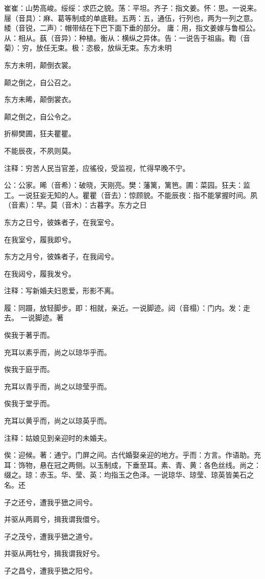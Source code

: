 \documentclass[12pt,UTF8]{ctexbook}
\begin{document}
崔崔：山势高峻。绥绥：求匹之貌。荡：平坦。齐子：指文姜。怀：思。一说来。屦（音具）：麻、葛等制成的单底鞋。五两：五，通伍，行列也，两为一列之意。緌（音锐，二声）：帽带结在下巴下面下垂的部分。 庸：用，指文姜嫁与鲁桓公。从：相从。蓺（音异）：种植。衡从：横纵之异体。告：一说告于祖庙。鞫（音菊）：穷，放任无束。极：恣极，放纵无束。东方未明

东方未明，颠倒衣裳。

颠之倒之，自公召之。

东方未晞，颠倒裳衣。

颠之倒之，自公令之。

折柳樊圃，狂夫瞿瞿。

不能辰夜，不夙则莫。

注释：穷苦人民当官差，应徭役，受监视，忙得早晚不宁。

公：公家。晞（音希）：破晓，天刚亮。樊：藩篱，篱笆。圃：菜园。狂夫：监工。一说狂妄无知的人。瞿瞿（音去）：惊顾貌。不能辰夜：指不能掌握时间。夙（音素）：早。莫（音木）：古暮字。东方之日

东方之日兮，彼姝者子，在我室兮。

在我室兮，履我即兮。

东方之月兮，彼姝者子，在我闼兮。

在我闼兮，履我发兮。

注释：写新婚夫妇恩爱，形影不离。

履：同蹑，放轻脚步。即：相就，亲近。一说脚迹。闼（音榻）：门内。发：走去。 一说脚迹。著

俟我于著乎而。

充耳以素乎而，尚之以琼华乎而。

俟我于庭乎而。

充耳以青乎而，尚之以琼莹乎而。

俟我于堂乎而。

充耳以黄乎而，尚之以琼英乎而。

注释：姑娘见到亲迎时的未婚夫。

俟：迎候。著：通宁。门屏之间。古代婚娶亲迎的地方。乎而：方言。作语助。充耳：饰物，悬在冠之两侧。以玉制成，下垂至耳。素、青、黄：各色丝线。尚之：缀之。琼：赤玉。华、莹、英：均指玉之色泽。一说琼华、琼莹、琼英皆美石之名。还

子之还兮，遭我乎峱之间兮。

并驱从两肩兮，揖我谓我儇兮。

子之茂兮，遭我乎峱之道兮。

并驱从两牡兮，揖我谓我好兮。

子之昌兮，遭我乎峱之阳兮。
\end{document}
